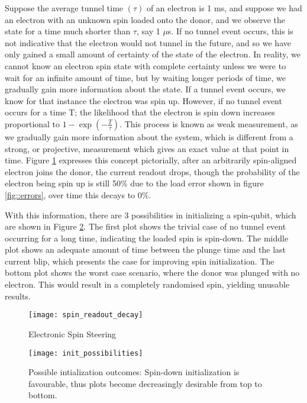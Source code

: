 	Suppose the average tunnel time $(\tau)$ of an electron is 1 ms, and suppose we had an electron with an unknown spin loaded onto the donor, and we observe the state for a time much shorter than $\tau$, say 1 $\mu$s. If no tunnel event occurs, this is not indicative that the electron would not tunnel in the future, and so we have only gained a small amount of certainty of the state of the electron. In reality, we cannot know an electron spin state with complete certainty unless we were to wait for an infinite amount of time, but by waiting longer periods of time, we gradually gain more information about the state. If a tunnel event occurs, we know for that instance the electron was spin up. However, if no tunnel event occurs for a time T; the likelihood that the electron is spin down increases proportional to $1-\exp\left(-\frac{T}{\tau}\right)$.  This process is known as weak measurement, as we gradually gain more information about the system, which is different from a strong, or projective, measurement which gives an exact value at that point in time. Figure \ref{fig::spin_readout_decay} expresses this concept pictorially, after an arbitrarily spin-aligned electron joins the donor, the current readout drops, though the probability of the electron being spin up is still 50\% due to the load error shown in figure \ref{fig::errors}, over time this decays to 0\%. 
	
	With this information, there are 3 possibilities in initializing a spin-qubit, which are shown in Figure \ref{fig::init_possibilities}. The first plot shows the trivial case of no tunnel event occurring for a long time, indicating the loaded spin is spin-down. The middle plot shows an adequate amount of time between the plunge time and the last current blip, which presents the case for improving spin initialization. The bottom plot shows the worst case scenario, where the donor was plunged with no electron. This would result in a completely randomised spin, yielding unusable results. 
	
	\begin{figure}[htbp!]
		\centering
		\texttt{[image: spin\_readout\_decay]}
		\caption{Electronic Spin Steering}
		\label{fig::spin_readout_decay}
	\end{figure}
	
	\begin{figure}[htbp!]
		\centering
		\texttt{[image: init\_possibilities]}
		\caption[Possible initialisation outcomes]{Possible intialization outcomes: Spin-down initialization is favourable, thus plots become decreasingly desirable from top to bottom.}
		\label{fig::init_possibilities}
	\end{figure}
	
